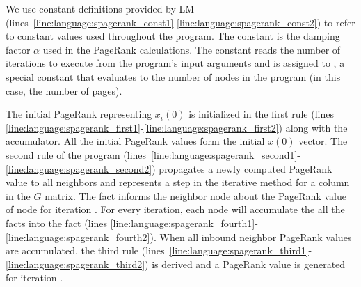 We use constant definitions provided by LM
(lines~\ref{line:language:spagerank_const1}-\ref{line:language:spagerank_const2})
to refer to constant values used throughout the program. The 
constant is the damping factor $\alpha$ used in the PageRank calculations. The
constant  reads the number of iterations to execute from the
program's input arguments and  is assigned to , a
special constant that evaluates to the number of nodes in the program (in this
case, the number of pages).

The initial PageRank representing $x_i(0)$ is initialized in the first rule
(lines
\ref{line:language:spagerank_first1}-\ref{line:language:spagerank_first2}) along
with the accumulator. All the initial PageRank values form the initial $x(0)$
vector. The second rule of the program
(lines~\ref{line:language:spagerank_second1}-\ref{line:language:spagerank_second2})
propagates a newly computed PageRank value to all neighbors and represents a
step in the iterative method for a column in the $G$ matrix. The fact
 informs the neighbor node about the PageRank value of
node  for iteration . For every iteration, each node will
accumulate the all the  facts into the
 fact (lines
\ref{line:language:spagerank_fourth1}-\ref{line:language:spagerank_fourth2}).
When all inbound neighbor PageRank values are accumulated, the third rule
(lines~\ref{line:language:spagerank_third1}-\ref{line:language:spagerank_third2})
is derived and a PageRank value is generated for iteration .

